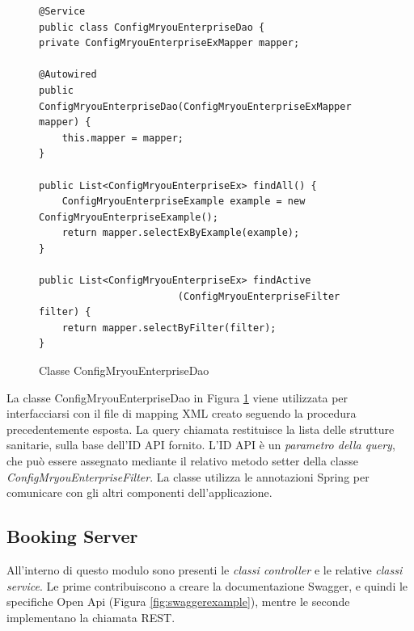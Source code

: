 \begin{figure}
\begin{verbatim}
@Service
public class ConfigMryouEnterpriseDao {    
private ConfigMryouEnterpriseExMapper mapper;

@Autowired
public ConfigMryouEnterpriseDao(ConfigMryouEnterpriseExMapper mapper) {
    this.mapper = mapper;
}

public List<ConfigMryouEnterpriseEx> findAll() {
    ConfigMryouEnterpriseExample example = new ConfigMryouEnterpriseExample();
    return mapper.selectExByExample(example);    
}

public List<ConfigMryouEnterpriseEx> findActive      
                        (ConfigMryouEnterpriseFilter filter) {
    return mapper.selectByFilter(filter);
}
\end{verbatim}
\caption{Classe ConfigMryouEnterpriseDao}
\label{fig:daoclass}
\end{figure}

La classe ConfigMryouEnterpriseDao in Figura \ref{fig:daoclass} viene utilizzata per interfacciarsi con il file di mapping XML creato seguendo la procedura precedentemente esposta. La query chiamata restituisce la lista delle strutture sanitarie, sulla base dell'ID API fornito. L'ID API è un \emph{parametro della query}, che può essere assegnato mediante il relativo metodo setter della classe \emph{ConfigMryouEnterpriseFilter}. La classe utilizza le annotazioni Spring per comunicare con gli altri componenti dell'applicazione.

\subsection{Booking Server}
All'interno di questo modulo sono presenti le \emph{classi controller} e le relative \emph{classi service}. Le prime contribuiscono a creare la documentazione Swagger, e quindi le specifiche Open Api (Figura \ref{fig:swaggerexample}), mentre le seconde implementano la chiamata REST.

